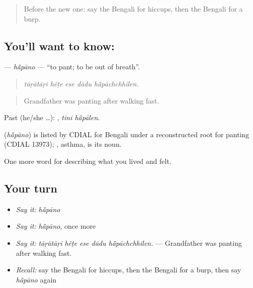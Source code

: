 \label{lesson:BN-C476-hapano}



\begin{quote}
Before the new one: say the Bengali for hiccups, then the Bengali for a burp.
\end{quote}

\subsection*{You'll want to know: }
\textbf{} — \emph{hā̃pāno} — \textquotedblleft{}to pant; to be out of breath\textquotedblright{}.

\begin{quote}
    
\end{quote}

\begin{quote}
\emph{tāṛātāṛi hẽṭe ese dādu hā̃pāchchhilen.}
\end{quote}

\begin{quote}
Grandfather was panting after walking fast.
\end{quote}

Past (he/she …):  , \emph{tini hā̃pālen}.

\begin{cousinweb}
\textbf{} (\emph{hā̃pāno}) is listed by CDIAL for Bengali under a reconstructed root for panting (CDIAL 13973); , asthma, is its noun.
\end{cousinweb}

\begin{grammarlens}[title={What you've built}]
One more word for describing what you lived and felt.
\end{grammarlens}

\subsection*{Your turn}
\begin{itemize}
\raggedright
  \item \emph{Say it:} \emph{hā̃pāno}
  \item \emph{Say it:} \emph{hā̃pāno}, once more
  \item \emph{Say it:} \emph{tāṛātāṛi hẽṭe ese dādu hā̃pāchchhilen.} — Grandfather was panting after walking fast.
  \item \emph{Recall:} say the Bengali for hiccups, then the Bengali for a burp, then say \emph{hā̃pāno} again
\end{itemize}

